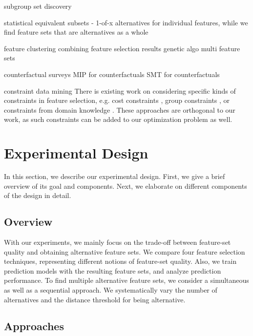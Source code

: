 \documentclass{article}
\theoremstyle{definition}
\begin{document}
subgroup set discovery \cite{leeuwen2012diverse}

statistical equivalent subsets \cite{lagani2017feature, borboudakis2021extending, tsamardinos2003towards, dougherty2006number} - 1-of-x alternatives for individual features, while we find feature sets that are alternatives as a whole

feature clustering \cite{mueller2021feature}
combining feature selection results \cite{woznica2012model}
genetic algo multi feature sets \cite{siddiqi2020genetic}

counterfactual surveys \cite{verma2020counterfactual, stepin2021survey}
MIP for counterfactuals \cite{mohammadi2021scaling}
SMT for counterfactuals \cite{karimi2020model}

constraint data mining \cite{grossi2017survey}
There is existing work on considering specific kinds of constraints in feature selection, e.g. cost constraints \cite{paclik2002feature}, group constraints \cite{yuan2006model}, or constraints from domain knowledge \cite{groves2015toward}.
These approaches are orthogonal to our work, as such constraints can be added to our optimization problem as well.

\section{Experimental Design}
\label{sec:experimental-design}

In this section, we describe our experimental design.
First, we give a brief overview of its goal and components.
Next, we elaborate on different components of the design in detail.

\subsection{Overview}

With our experiments, we mainly focus on the trade-off between feature-set quality and obtaining alternative feature sets.
We compare four feature selection techniques, representing different notions of feature-set quality.
Also, we train prediction models with the resulting feature sets, and analyze prediction performance.
To find multiple alternative feature sets, we consider a simultaneous as well as a sequential approach.
We systematically vary the number of alternatives and the distance threshold for being alternative.

\subsection{Approaches}
\end{document}
